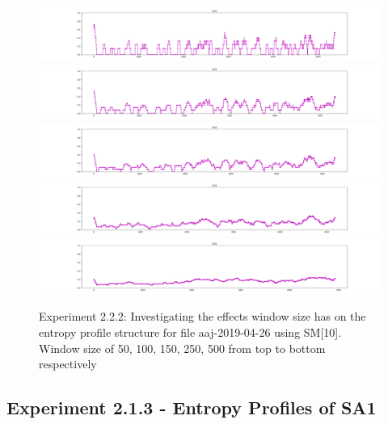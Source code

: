 \begin{figure}[h]
\begin{center}
	\includegraphics[scale=0.15]{src/main-matter/results/experiment-age/entropy/[10]/WindowSize(50)}
	\includegraphics[scale=0.15]{src/main-matter/results/experiment-age/entropy/[10]/WindowSize(100)}
	\includegraphics[scale=0.15]{src/main-matter/results/experiment-age/entropy/[10]/WindowSize(150)}
	\includegraphics[scale=0.15]{src/main-matter/results/experiment-age/entropy/[10]/WindowSize(250)}
	\includegraphics[scale=0.15]{src/main-matter/results/experiment-age/entropy/[10]/WindowSize(500)}
\caption{Experiment 2.2.2:  Investigating the effects window size has on the entropy profile structure for file aaj-2019-04-26 using SM[10]. Window size of 50, 100, 150, 250, 500 from top to bottom respectively}
\label{default}
\end{center}
\end{figure}






\subsection{Experiment 2.1.3 - Entropy Profiles of SA1}
